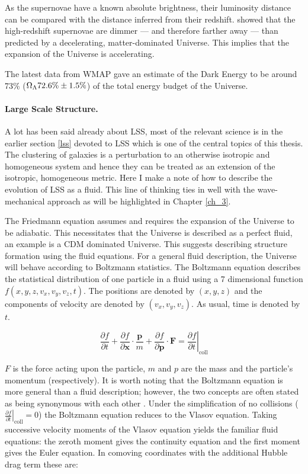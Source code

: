 As the supernovae have a known absolute brightness, their luminosity distance can be compared with the distance inferred from their redshift. \citet{bib_riess} showed that the high-redshift supernovae are dimmer --- and therefore farther away --- than predicted by a decelerating, matter-dominated Universe. This implies that the expansion of the Universe is accelerating.

The latest data from WMAP \citep{bib_wmap7} gave an estimate of the Dark Energy to be around 73\% ($\Omega_{\rm \Lambda} 72.6\%  \pm  1.5\%$) of the total energy budget of the Universe.


\paragraph{Large Scale Structure.} A lot has been said already about LSS, most of the relevant science is in the earlier section \ref{lss} devoted to LSS which is one of the central topics of this thesis. The clustering of galaxies is a perturbation to an otherwise isotropic and homogeneous system and hence they can be treated as an extension of the isotropic, homogeneous metric. Here I make a note of how to describe the evolution of LSS as a fluid. This line of thinking ties in well with the wave-mechanical approach as will be highlighted in Chapter \ref{ch_3}.

The Friedmann equation assumes and requires the expansion of the Universe to be adiabatic. This necessitates that the Universe is described as a perfect fluid, an example is a CDM dominated Universe. This suggests describing structure formation using the fluid equations. For a general fluid description, the Universe will behave according to Boltzmann statistics. The Boltzmann equation describes the statistical distribution of one particle in a fluid using a 7 dimensional function $f(x,y,z,v_x,v_y,v_z,t)$. The positions are denoted by $(x,y,z)$ and the components of velocity are denoted by $(v_x,v_y,v_z)$. As usual, time is denoted by $t$.

\begin{equation}
\frac{\partial f}{\partial t} + \frac{\partial f}{\partial \mathbf{x}} \cdot \frac{\mathbf{p}}{m} + \frac{\partial f}{\partial \mathbf{p}} \cdot \mathbf{F} = \left. \frac{\partial f}{\partial t} \right|_{\mathrm{coll}}
\end{equation}


\noindent $F$ is the force acting upon the particle, $m$ and $p$ are the mass and the particle's momentum (respectively). It is worth noting that the Boltzmann equation is more general than a fluid description; however, the two concepts are often stated as being synonymous with each other \citep{bib_pea}. Under the simplification of no collisions ($\left. \frac{\partial f}{\partial t} \right|_{\mathrm{coll}} =0 $) the Boltzmann equation reduces to the Vlasov equation. Taking successive velocity moments of the Vlasov equation yields the familiar fluid equations: the zeroth moment gives the continuity equation and the first moment gives the Euler equation. In comoving coordinates with the additional Hubble drag term these are:

